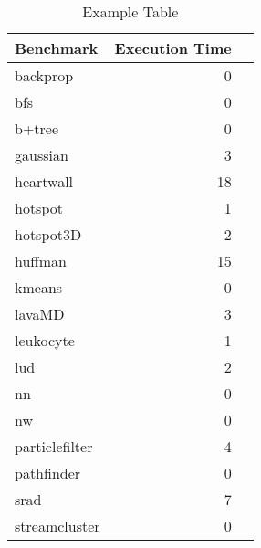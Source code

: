 \begin{table}
\centering
\begin{tabular}{l r r}
\toprule
\textbf{Benchmark} & \textbf{Execution Time} & \\ \midrule
backprop & 0 \\
bfs & 0\\
b+tree & 0\\
gaussian & 3\\
heartwall & 18\\
hotspot & 1\\
hotspot3D & 2\\
huffman & 15\\
kmeans & 0\\
lavaMD & 3\\
leukocyte & 1\\
lud & 2\\
nn & 0\\
nw & 0\\
particlefilter & 4\\
pathfinder & 0\\
srad & 7\\
streamcluster & 0\\
\bottomrule
\end{tabular}
\nocaptionrule\caption{Example Table}
\label{fig:tbl:ex}
\end{table}
